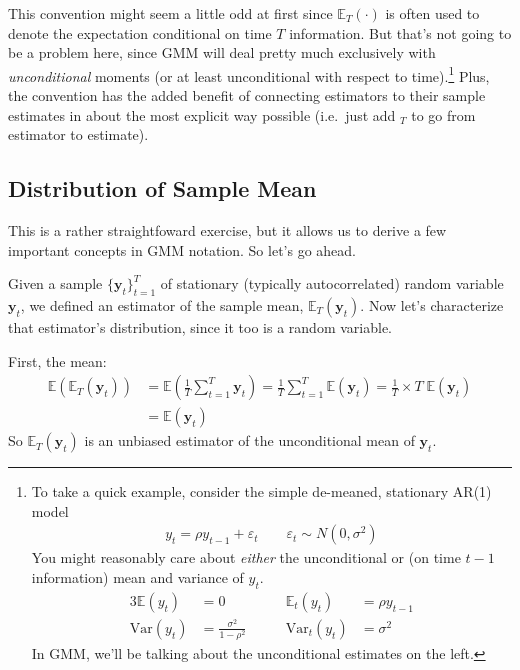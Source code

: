 \documentclass[12pt]{article}
\theoremstyle{plain}
\theoremstyle{definition}
\theoremstyle{remark}
\begin{document}
This convention might seem a little odd at first since
$\mathbb{E}_T(\cdot)$ is often used to denote the expectation
conditional on time $T$ information. But that's not going to be a
problem here, since GMM will deal pretty much exclusively with
\emph{unconditional} moments (or at least unconditional with respect to
time).\footnote{%
To take a quick example, consider the simple de-meaned, stationary AR(1)
model
\begin{align*}
  y_t = \rho y_{t-1} + \varepsilon_t
  \qquad \varepsilon_t \sim N(0,\sigma^2)
\end{align*}
You might reasonably care about \emph{either} the unconditional or (on
time $t-1$ information) mean and variance of $y_t$.
\begin{alignat*}{3}
  \mathbb{E}(y_t) &= 0 &\mathbb{E}_t(y_{t}) &= \rho y_{t-1}\\
  \text{Var}(y_t) &= \frac{\sigma^2}{1-\rho^2}
  \qquad
  &\text{Var}_t(y_t) &= \sigma^2
\end{alignat*}
In GMM, we'll be talking about the unconditional estimates on the left.
}
Plus, the convention has the added benefit of connecting estimators to
their sample estimates in about the most explicit way possible (i.e.\
just add ${}_T$ to go from estimator to estimate).


\subsection{Distribution of Sample Mean}
\label{sec:mean}

This is a rather straightfoward exercise, but it allows us to derive a
few important concepts in GMM notation. So let's go ahead.

Given a sample $\{\boldsymbol{y}_t\}^T_{t=1}$ of stationary (typically
autocorrelated) random variable $\boldsymbol{y}_t$, we defined an
estimator of the sample mean, $\mathbb{E}_T(\boldsymbol{y}_t)$. Now
let's characterize that estimator's distribution, since it too is a
random variable.

First, the mean:
\begin{align*}
  \mathbb{E}\left(\mathbb{E}_T(\boldsymbol{y}_t)\right)
  &= \mathbb{E}\left(\frac{1}{T}\sum^T_{t=1} \boldsymbol{y}_t\right)
  = \frac{1}{T}\sum^T_{t=1} \mathbb{E}\left(\boldsymbol{y}_t\right)
  = \frac{1}{T} \times T \; \mathbb{E}\left(\boldsymbol{y}_t\right)\\
  &= \mathbb{E}\left(\boldsymbol{y}_t\right)
\end{align*}
So $\mathbb{E}_T(\boldsymbol{y}_t)$ is an unbiased estimator of the
unconditional mean of $\boldsymbol{y}_t$.
\end{document}
